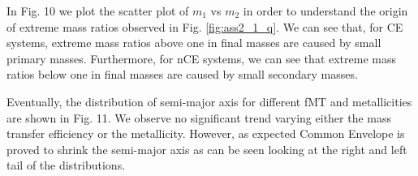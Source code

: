\documentclass[prb,twocolumn,9pt]{revtex4-1}
\begin{document}
In Fig. 10 we plot the scatter plot of \(m_1\) vs \(m_2\) in order to understand the origin of extreme mass ratios observed in Fig. \ref{fig:ass2_1_q}. We can see that, for CE systems, extreme mass ratios above one in final masses are caused by small primary masses.  Furthermore, for nCE systems, we can see that extreme mass ratios below one in final masses are caused by small secondary masses.

Eventually, the distribution of semi-major axis for different fMT and metallicities are shown in Fig. 11. We observe no significant trend varying either the mass transfer efficiency or the metallicity. However, as expected Common Envelope is proved to shrink the semi-major axis as can be seen looking at the right and left tail of the distributions. 
\end{document}
